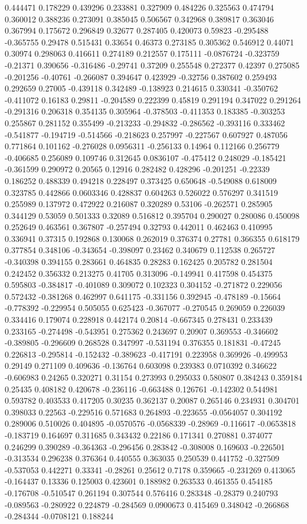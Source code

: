 0.444471 0.178229 0.439296 0.233881 0.327909 0.484226 0.325563 0.474794 0.360012 0.388236 0.273091 0.385045 0.506567 0.342968 0.389817 0.363046 0.367994 0.175672 0.296849 0.32677 0.287405 0.420073 0.59823 -0.295488 -0.365755 0.29478 0.515431 0.33654 0.46373 0.273185 0.305362 0.546912 0.44071 0.30974 0.298063 0.416611 0.274189 0.212557 0.175111 -0.0876724 -0.323759 -0.21371 0.390656 -0.316486 -0.29741 0.37209 0.255548 0.272377 0.42397 0.275085 -0.201256 -0.40761 -0.266087 0.394647 0.423929 -0.32756 0.387602 0.259493 0.292659 0.27005 -0.439118 0.342489 -0.138923 0.214615 0.330341 -0.350762 -0.411072 0.16183 0.29811 -0.204589 0.222399 0.45819 0.291194 0.347022 0.291264 -0.291316 0.206318 0.354135 0.305964 -0.378503 -0.411353 0.183385 -0.303253 0.255867 0.281152 0.355499 -0.213233 -0.294832 -0.286562 -0.393116 0.333462 -0.541877 -0.194719 -0.514566 -0.218623 0.257997 -0.227567 0.607927 0.487056 0.771864 0.101162 -0.276028 0.0956311 -0.256133 0.14964 0.112166 0.256779 -0.406685 0.256089 0.109746 0.312645 0.0836107 -0.475412 0.248029 -0.185421 -0.361599 0.290972 0.20565 0.12916 0.282482 0.428296 -0.201251 -0.22339 0.186252 0.488339 0.494218 0.228497 0.373425 0.650648 -0.549088 0.618009 0.323785 0.442866 0.0603346 0.428837 0.604263 0.526022 0.576297 0.341519 0.255989 0.137972 0.472922 0.216087 0.320289 0.53106 -0.262571 0.285905 0.344129 0.53059 0.501333 0.32089 0.516812 0.395704 0.290027 0.280086 0.450098 0.252649 0.463561 0.367807 -0.257494 0.32793 0.442011 0.462463 0.410995 0.336941 0.37315 0.192868 0.130068 0.262019 0.376374 0.27781 0.366355 0.618179 0.377854 0.348106 -0.343654 -0.398097 0.23462 0.340679 0.112538 0.265727 -0.340398 0.394155 0.283661 0.464835 0.28283 0.162425 0.205782 0.281504 0.242452 0.356332 0.213275 0.41705 0.313096 -0.149941 0.417598 0.454375 0.595803 -0.384817 -0.401089 0.309072 0.102323 0.304152 -0.271872 0.229056 0.572432 -0.381268 0.462997 0.641175 -0.331156 0.392945 -0.478189 -0.15664 -0.778392 -0.229954 0.505055 0.625423 -0.367077 -0.270545 0.269059 0.226039 0.334416 0.179074 0.228918 0.442174 0.20814 -0.667345 0.278431 0.233439 0.233165 -0.274498 -0.543951 0.275362 0.243697 0.20907 0.369553 -0.346602 -0.389805 -0.296609 0.268528 0.347997 -0.531194 0.376355 0.181831 -0.47245 0.226813 -0.295814 -0.152432 -0.389623 -0.417191 0.223958 0.369926 -0.499953 0.29149 0.271109 0.409636 -0.136764 0.603098 0.239383 0.0710392 0.346622 -0.606983 0.24265 0.320271 0.31154 0.273993 0.295033 0.580807 0.384243 0.359184 0.25435 0.408182 0.420678 -0.236116 -0.663488 0.126761 -0.142302 0.544981 0.593782 0.403533 0.417205 0.30235 0.362137 0.20087 0.265146 0.234931 0.304701 0.398033 0.22563 -0.229516 0.571683 0.264893 -0.223655 -0.0564057 0.304192 0.289006 0.510026 0.404895 -0.0570576 -0.0568339 -0.28969 -0.116617 -0.0653818 -0.183719 0.164697 0.311685 0.343432 0.22186 0.171341 0.270881 0.374077 0.246299 0.390289 -0.364363 -0.296456 0.283842 -0.308008 0.169603 -0.226501 -0.313534 0.296238 0.376364 0.440555 0.363035 0.250539 0.441752 -0.327509 -0.537053 0.442271 0.33341 -0.28261 0.25612 0.7178 0.359665 -0.231269 0.413065 -0.164437 0.13336 0.125003 0.423601 0.188982 0.263533 0.461355 0.454185 -0.176708 -0.510547 0.261194 0.307544 0.576416 0.283348 -0.28379 0.240793 -0.089563 -0.280922 0.224879 -0.284569 0.0900673 0.415469 0.348042 -0.266868 -0.284344 -0.0708121 0.188244 